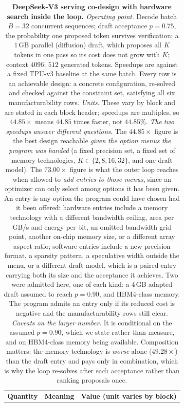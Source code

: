 \begin{table}[h]
\centering
\footnotesize
\caption{\textbf{DeepSeek-V3 serving co-design with hardware search inside the
loop.}
\emph{Operating point.} Decode batch $B{=}32$ concurrent sequences; draft
acceptance $p{=}0.75$, the probability one proposed token survives verification;
a $1$\,GB parallel (diffusion) draft, which proposes all $K$ tokens in one pass
so its cost does not grow with $K$; context $4096$; $512$ generated tokens.
Speedups are against a fixed TPU-v3 baseline at the same batch. Every row is an
achievable design: a concrete configuration, re-solved and checked against the
constraint set, satisfying all six manufacturability rows.
\emph{Units.} These vary by block and are stated in each block header; speedups
are multiples, so $44.85\times$ means $44.85$ times faster, not $44.85\%$.
\emph{The two speedups answer different questions.} The $44.85\times$ figure is
the best design reachable \emph{given the option menus the program was handed}
(a fixed precision set, a fixed set of memory technologies, $K \in
\{2,8,16,32\}$, and one draft model). The $73.00\times$ figure is what the outer
loop reaches when allowed to \emph{add entries to those menus}, since an
optimizer can only select among options it has been given. An entry is any
option the program could have chosen had it been offered: hardware entries
include a memory technology with a different bandwidth ceiling, area per GB/s
and energy per bit, an omitted bandwidth grid point, another on-chip memory
size, or a different array aspect ratio; software entries include a new
precision format, a sparsity pattern, a speculative width outside the menu, or a
different draft model, which is a paired entry carrying both its size and the
acceptance it achieves. Two were admitted here, one of each kind: a $4$\,GB
adapted draft assumed to reach $p{=}0.90$, and HBM4-class memory. The program
admits an entry only if its reduced cost is negative and the manufacturability
rows still clear.
\emph{Caveats on the larger number.} It is conditional on the assumed $p{=}0.90$,
which we state rather than measure, and on HBM4-class memory being available.
Composition matters: the memory technology is \emph{worse} alone
($49.28\times$) than the draft entry and pays only in combination, which is why
the loop re-solves after each acceptance rather than ranking proposals once.}
\label{tab:deepseek_summary}
\begin{tabular}{@{}llr@{}}
\toprule
\textbf{Quantity} & \textbf{Meaning} & \textbf{Value (unit varies by block)} \\

\end{tabular}
\end{table}

